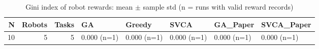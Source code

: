 \begin{table}[htbp]
\centering
\small
\caption{Gini index of robot rewards: mean $\pm$ sample std (n = runs with valid reward records)}
\label{tab:research_smoke_c1_r1_20261122_gini}
\begin{tabular}{rrrlllll}
\hline
N & Robots & Tasks & GA & Greedy & SVCA & GA\_Paper & SVCA\_Paper \\
\hline
10 & 5 & 5 & 0.000 (n=1) & 0.000 (n=1) & 0.000 (n=1) & 0.000 (n=1) & 0.000 (n=1) \\
\hline
\end{tabular}
\end{table}
